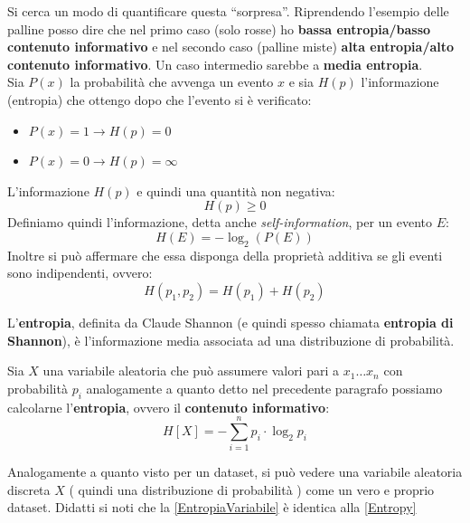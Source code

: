 Si cerca un modo di quantificare questa ``sorpresa''. Riprendendo l'esempio
delle palline posso dire che nel primo caso (solo rosse) ho \textbf{bassa
  entropia/basso contenuto informativo} e nel secondo caso (palline miste) \textbf{alta entropia/alto contenuto informativo}. Un caso
intermedio sarebbe a \textbf{media entropia}.\\
Sia $P(x)$ la probabilità che avvenga un evento $x$ e sia $H(p)$ l'informazione (entropia) che ottengo dopo che l'evento si è verificato:
\begin{itemize}
  \item $P(x)=1\to H(p)=0$
  \item $P(x)=0\to H(p)=\infty$
\end{itemize}
L'informazione $H(p)$ e quindi una quantità non negativa:
\[H(p)\geq 0\]
Definiamo quindi l'informazione, detta anche \textit{self-information}, per un
evento $E$: 
\[H(E)=-\log_2(P(E))\]
Inoltre si può affermare che essa disponga della proprietà additiva se gli eventi sono indipendenti, ovvero:
\[H(p_1, p_2)=H(p_1)+H(p_2)\]

  L'\textbf{entropia}, definita da Claude Shannon (e quindi spesso chiamata
  \textbf{entropia di Shannon}), è l'informazione media associata ad
  una distribuzione di probabilità.\\
\begin{definizione}
Sia $X$ una variabile aleatoria che può assumere valori pari a ${x_1 \dots x_n}$ con probabilità $p_i$ analogamente a quanto detto nel precedente paragrafo possiamo calcolarne l'\textbf{entropia}, ovvero il \textbf{contenuto informativo}:
\begin{equation}
    H[X]=-\sum_{i=1}^n p_i\cdot\log_2 p_i
\label{EntropiaVariabile}
\end{equation}
\end{definizione}
Analogamente a quanto visto per un dataset, si può vedere una variabile aleatoria discreta $X$ ( quindi una distribuzione di probabilità ) come un vero e proprio dataset. Didatti si noti che la \ref{EntropiaVariabile} è identica alla \ref{Entropy}

